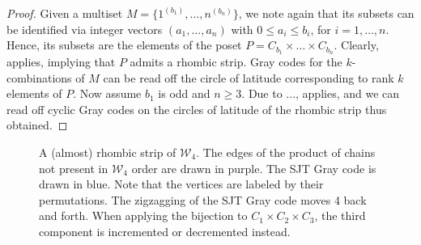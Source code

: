 \documentclass[fontsize=11pt,a4paper,DIV=12]{scrartcl}
\begin{document}
\multisetcombinations*
\begin{proof}
    Given a multiset $M=\{1^{(b_1)},\ldots,n^{(b_n)}\}$, we note again that its subsets can be identified via integer vectors $(a_1,\ldots,a_n)$ with $0\le a_i\le b_i$, for $i=1,\ldots,n$. Hence, its subsets are the elements of the poset $P=C_{b_1}\times\ldots\times C_{b_n}$. Clearly,  applies, implying that $P$ admits a rhombic strip. Gray codes for the $k$-combinations of $M$ can be read off the circle of latitude corresponding to rank $k$ elements of $P$. Now assume $b_1$ is odd and $n\ge 3$. Due to ...,  applies, and we can read off cyclic Gray codes on the circles of latitude of the rhombic strip thus obtained.
\end{proof}

\begin{figure}
    \centering
    
    \caption{A (almost) rhombic strip of $\mathcal W_4$. The edges of the product of chains not present in $\mathcal W_4$ order are drawn in purple. The SJT Gray code is drawn in blue. Note that the vertices are labeled by their permutations. The zigzagging of the SJT Gray code moves 4 back and forth. When applying the bijection to $C_1\times C_2\times C_3$, the third component is incremented or decremented instead.}
    \label{fig:weakBruhat4}
\end{figure}
\end{document}
